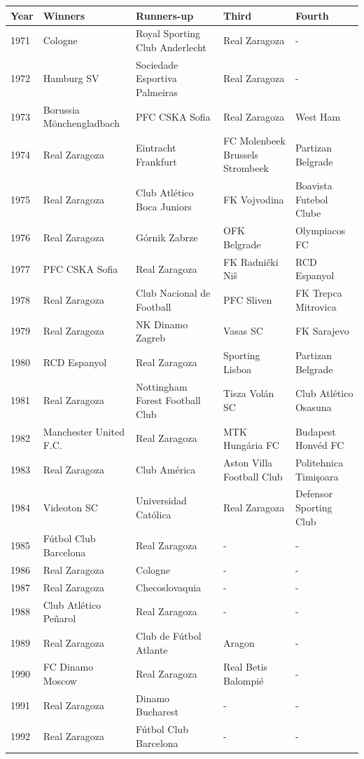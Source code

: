 \documentclass{article}
\begin{document}
\begin{tabular}{lllll}
\toprule
Year & Winners & Runners-up & Third & Fourth \\
\midrule
1971 & Cologne & Royal Sporting Club Anderlecht & Real Zaragoza & - \\
1972 & Hamburg SV & Sociedade Esportiva Palmeiras & Real Zaragoza & - \\
1973 & Borussia Mönchengladbach & PFC CSKA Sofia & Real Zaragoza & West Ham \\
1974 & Real Zaragoza & Eintracht Frankfurt & FC Molenbeek Brussels Strombeek & Partizan Belgrade \\
1975 & Real Zaragoza & Club Atlético Boca Juniors & FK Vojvodina & Boavista Futebol Clube \\
1976 & Real Zaragoza & Górnik Zabrze & OFK Belgrade & Olympiacos FC \\
1977 & PFC CSKA Sofia & Real Zaragoza & FK Radnički Niš & RCD Espanyol \\
1978 & Real Zaragoza & Club Nacional de Football & PFC Sliven & FK Trepca Mitrovica \\
1979 & Real Zaragoza & NK Dinamo Zagreb & Vasas SC & FK Sarajevo \\
1980 & RCD Espanyol & Real Zaragoza & Sporting Lisboa & Partizan Belgrade \\
1981 & Real Zaragoza & Nottingham Forest Football Club & Tisza Volán SC & Club Atlético Osasuna \\
1982 & Manchester United F.C. & Real Zaragoza & MTK Hungária FC & Budapest Honvéd FC \\
1983 & Real Zaragoza & Club América & Aston Villa Football Club & Politehnica Timişoara \\
1984 & Videoton SC & Universidad Católica & Real Zaragoza & Defensor Sporting Club \\
1985 & Fútbol Club Barcelona & Real Zaragoza & - & - \\
1986 & Real Zaragoza & Cologne & - & - \\
1987 & Real Zaragoza & Checoslovaquia & - & - \\
1988 & Club Atlético Peñarol & Real Zaragoza & - & - \\
1989 & Real Zaragoza & Club de Fútbol Atlante & Aragon & - \\
1990 & FC Dinamo Moscow & Real Zaragoza & Real Betis Balompié & - \\
1991 & Real Zaragoza & Dinamo Bucharest & - & - \\
1992 & Real Zaragoza & Fútbol Club Barcelona & - & - \\

\end{tabular}
\end{document}
